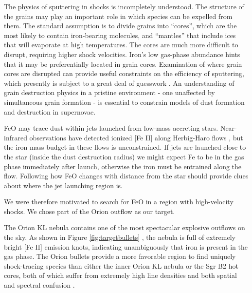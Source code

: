 \documentclass[twocolumn]{aastex61}
\begin{document}

The physics of sputtering in shocks is incompletely understood.  The
structure of the grains may play an important role in which species can be
expelled from them.  The standard assumption is to divide grains into
``cores'', which are the most likely to contain iron-bearing molecules, and
``mantles'' that include ices that will evaporate at high temperatures.  The
cores are much more difficult to disrupt, requiring higher shock velocities.
Iron's low gas-phase abundance hints that it may be preferentially located in grain
cores.  Examination of where grain cores are disrupted can provide useful
constraints on the efficiency of sputtering, which presently is subject to a
great deal of guesswork \citep{Schilke1997a}.  An understanding of grain
destruction physics in a pristine environment - one unaffected by simultaneous
grain formation - is essential to constrain models of dust formation and
destruction in supernovae.

FeO may trace dust within jets launched from low-mass accreting stars.
Near-infrared observations have detected ionized [Fe II] along Herbig-Haro
flows \citep[e.g. HH 111;][]{Nisini2002a}, but the iron mass budget in these
flows is unconstrained.  If jets are launched close to the star (inside the
dust destruction radius) we might expect Fe to be in the gas phase immediately
after launch, otherwise the iron must be entrained along the flow. Following
how FeO changes with distance from the star should provide clues about where
the jet launching region is.   

We were therefore motivated to search for FeO in a region with high-velocity
shocks.  We chose part of the Orion outflow as our target.


The Orion KL nebula contains one of the most spectacular explosive outflows on
the sky.  As shown in Figure \ref{fig:targetbullets}
\citep{Bally2015a,Bally2017a}, the nebula is full of extremely bright [Fe II]
emission knots, indicating unambiguously that iron is present in the gas phase.  
The Orion bullets provide a more favorable region to find uniquely
shock-tracing species than either the inner Orion KL nebula or the Sgr B2 hot cores,
both of which suffer from extremely high line densities and both spatial and
spectral confusion \citep{Niederhofer2012a,Belloche2013a}.
\end{document}

